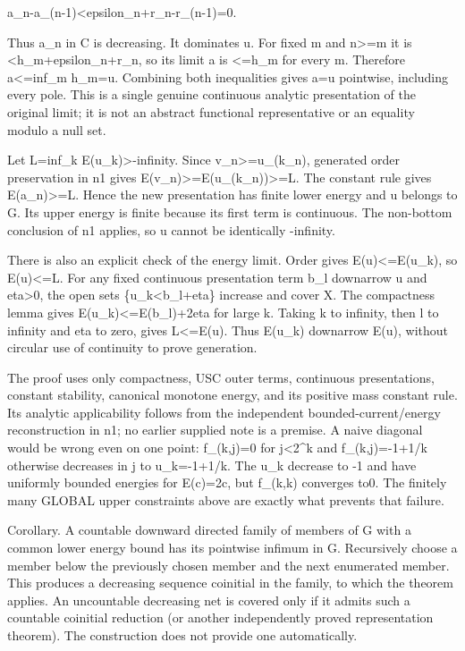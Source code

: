 \documentclass[11pt]{article}
\begin{document}
a\_n-a\_(n-1)<epsilon\_n+r\_n-r\_(n-1)=0.

Thus a\_n in C is decreasing. It dominates u. For fixed m and n>=m it is <h\_m+epsilon\_n+r\_n, so its limit a is <=h\_m for every m. Therefore a<=inf\_m h\_m=u. Combining both inequalities gives a=u pointwise, including every pole. This is a single genuine continuous analytic presentation of the original limit; it is not an abstract functional representative or an equality modulo a null set.

Let L=inf\_k E(u\_k)>-infinity. Since v\_n>=u\_(k\_n), generated order preservation in n1 gives E(v\_n)>=E(u\_(k\_n))>=L. The constant rule gives E(a\_n)>=L. Hence the new presentation has finite lower energy and u belongs to G. Its upper energy is finite because its first term is continuous. The non-bottom conclusion of n1 applies, so u cannot be identically -infinity.

There is also an explicit check of the energy limit. Order gives E(u)<=E(u\_k), so E(u)<=L. For any fixed continuous presentation term b\_l downarrow u and eta>0, the open sets \{u\_k<b\_l+eta\} increase and cover X. The compactness lemma gives E(u\_k)<=E(b\_l)+2eta for large k. Taking k to infinity, then l to infinity and eta to zero, gives L<=E(u). Thus E(u\_k) downarrow E(u), without circular use of continuity to prove generation.

The proof uses only compactness, USC outer terms, continuous presentations, constant stability, canonical monotone energy, and its positive mass constant rule. Its analytic applicability follows from the independent bounded-current/energy reconstruction in n1; no earlier supplied note is a premise. A naive diagonal would be wrong even on one point: f\_(k,j)=0 for j<2\textasciicircum{}k and f\_(k,j)=-1+1/k otherwise decreases in j to u\_k=-1+1/k. The u\_k decrease to -1 and have uniformly bounded energies for E(c)=2c, but f\_(k,k) converges to0. The finitely many GLOBAL upper constraints above are exactly what prevents that failure.

Corollary. A countable downward directed family of members of G with a common lower energy bound has its pointwise infimum in G. Recursively choose a member below the previously chosen member and the next enumerated member. This produces a decreasing sequence coinitial in the family, to which the theorem applies. An uncountable decreasing net is covered only if it admits such a countable coinitial reduction (or another independently proved representation theorem). The construction does not provide one automatically.
\end{document}
